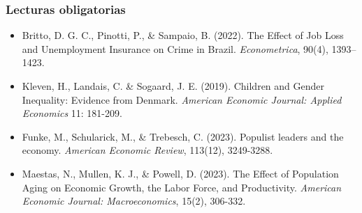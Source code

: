 \documentclass[10pt, xcolor=dvipsnames]{beamer}
\begin{document}
\begin{frame}\frametitle{Lecturas obligatorias}
\fontvic
\begin{itemize}      
    \item[{\color{blue}$\star$}] Britto, D. G. C., Pinotti, P., \& Sampaio, B. (2022). The Effect of Job Loss and Unemployment Insurance on Crime in Brazil. \textit{Econometrica}, 90(4), 1393–1423.
    
   \item[{\color{blue}$\star$}] Kleven, H., Landais, C. \& Sogaard, J. E. (2019). Children and Gender Inequality: Evidence from Denmark. \textit{American Economic Journal: Applied Economics} 11: 181-209.   

    \item[{\color{blue}{\color{blue}}$\star$}] Funke, M., Schularick, M.,  \& Trebesch, C. (2023). Populist leaders and the economy. \textit{American Economic Review}, 113(12), 3249-3288.
    
    \item[{\color{blue}{\color{blue}}$\star$}] Maestas, N., Mullen, K. J., \& Powell, D. (2023). The Effect of Population Aging on Economic Growth, the Labor Force, and Productivity. \textit{American Economic Journal: Macroeconomics}, 15(2), 306-332.
\end{itemize}
\end{frame}
\end{document}
